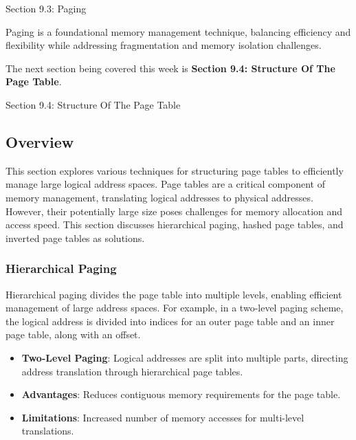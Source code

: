 \begin{notes}{Section 9.3: Paging}
\begin{highlight}
    Paging is a foundational memory management technique, balancing efficiency and flexibility while addressing fragmentation and memory isolation challenges.
    
    \end{highlight}
\end{notes}

The next section being covered this week is \textbf{Section 9.4: Structure Of The Page Table}.

\begin{notes}{Section 9.4: Structure Of The Page Table}
    \subsection*{Overview}

    This section explores various techniques for structuring page tables to efficiently manage large logical address spaces. Page tables are a critical component of memory management, translating 
    logical addresses to physical addresses. However, their potentially large size poses challenges for memory allocation and access speed. This section discusses hierarchical paging, hashed page 
    tables, and inverted page tables as solutions.

    \subsubsection*{Hierarchical Paging}

    Hierarchical paging divides the page table into multiple levels, enabling efficient management of large address spaces. For example, in a two-level paging scheme, the logical address is divided 
    into indices for an outer page table and an inner page table, along with an offset.

    \begin{highlight}

        \begin{itemize}
            \item \textbf{Two-Level Paging}: Logical addresses are split into multiple parts, directing address translation through hierarchical page tables.
            \item \textbf{Advantages}: Reduces contiguous memory requirements for the page table.
            \item \textbf{Limitations}: Increased number of memory accesses for multi-level translations.
        \end{itemize}


\end{highlight}
\end{notes}
